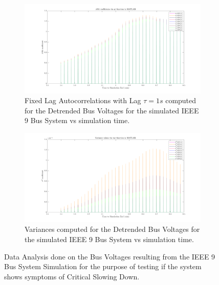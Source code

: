 \begin{figure}[!htpb]
	\begin{subfigure}{\textwidth}
		\centering
		\includegraphics[scale=0.25]{../figures/analysis_matlab/ar1_run02}
		\caption{Fixed Lag Autocorrelations with Lag $\tau = 1s$ computed for the Detrended Bus Voltages for the simulated IEEE 9 Bus System vs simulation time.}
	\end{subfigure}
	
	\begin{subfigure}{\textwidth}
		\centering
		\includegraphics[scale=0.25]{../figures/analysis_matlab/var_run02}
		\caption{Variances computed for the Detrended Bus Voltages for the simulated IEEE 9 Bus System vs simulation time.}
	\end{subfigure}
	
	\caption{Data Analysis done on the Bus Voltages resulting from the IEEE 9 Bus System Simulation for the purpose of testing if the system shows symptoms of Critical Slowing Down.}
\end{figure}

